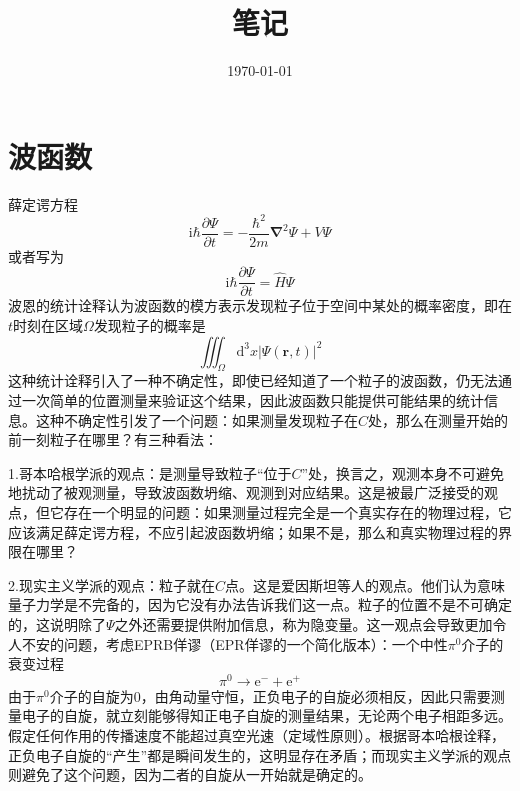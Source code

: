 \documentclass[12pt, a4paper, oneside]{ctexart}
\title{\Huge 笔记}
\date{\today}
\begin{document}
	\maketitle
	\section{波函数}
	薛定谔方程
	\begin{equation}
		\mathrm{i}\hbar\dfrac{\partial\Psi}{\partial t}=-\dfrac{\hbar^{2}}{2m}\boldsymbol{\nabla}^{2}\Psi+V\Psi
	\end{equation}
	\quad\quad 或者写为
	\begin{equation}
		\mathrm{i}\hbar\dfrac{\partial\Psi}{\partial t}=\hat{H}\Psi
	\end{equation}
	\quad\quad 波恩的统计诠释认为波函数的模方表示发现粒子位于空间中某处的概率密度，即在$t$时刻在区域$\Omega$发现粒子的概率是
	\begin{equation}
		\iiint_{\Omega}\mathrm{d}^{3}x\left|\Psi\left(\boldsymbol{r},t\right)\right|^{2}
	\end{equation}
	\quad\quad 这种统计诠释引入了一种不确定性，即使已经知道了一个粒子的波函数，仍无法通过一次简单的位置测量来验证这个结果，因此波函数只能提供可能结果的统计信息。这种不确定性引发了一个问题：如果测量发现粒子在$C$处，那么在测量开始的前一刻粒子在哪里？有三种看法：\par 
	1.哥本哈根学派的观点：是测量导致粒子“位于$C$”处，换言之，观测本身不可避免地扰动了被观测量，导致波函数坍缩、观测到对应结果。这是被最广泛接受的观点，但它存在一个明显的问题：如果测量过程完全是一个真实存在的物理过程，它应该满足薛定谔方程，不应引起波函数坍缩；如果不是，那么和真实物理过程的界限在哪里？\par 
	2.现实主义学派的观点：粒子就在$C$点。这是爱因斯坦等人的观点。他们认为意味量子力学是不完备的，因为它没有办法告诉我们这一点。粒子的位置不是不可确定的，这说明除了$\Psi$之外还需要提供附加信息，称为隐变量。这一观点会导致更加令人不安的问题，考虑EPRB佯谬（EPR佯谬的一个简化版本）：一个中性$\pi^{0}$介子的衰变过程
	\begin{equation}
		\pi^{0}\to\mathrm{e}^{-}+\mathrm{e}^{+}
	\end{equation}
	\quad\quad 由于$\pi^{0}$介子的自旋为$0$，由角动量守恒，正负电子的自旋必须相反，因此只需要测量电子的自旋，就立刻能够得知正电子自旋的测量结果，无论两个电子相距多远。假定任何作用的传播速度不能超过真空光速（定域性原则）。根据哥本哈根诠释，正负电子自旋的“产生”都是瞬间发生的，这明显存在矛盾；而现实主义学派的观点则避免了这个问题，因为二者的自旋从一开始就是确定的。\par 
\end{document}
